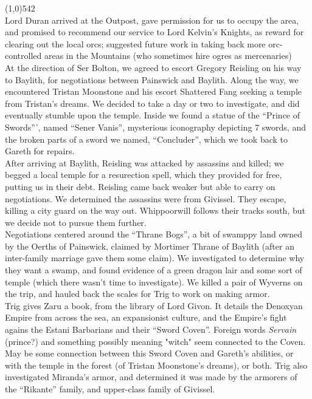 \documentclass[letterpaper]{article}
\newcommand{\fullline}{\noindent\line(1,0){542} \\}
\begin{document}
\vspace{-0.75em}
\fullline
\noindent Lord Duran arrived at the Outpost, gave permission for us to occupy the area, and promised to recommend our service to Lord Kelvin's Knights, as reward for clearing out the local orcs; suggested future work in taking back more orc-controlled areas in the Mountains (who sometimes hire ogres as mercenaries)\\

\noindent At the direction of Ser Bolton, we agreed to escort Gregory Reisling on his way to Baylith, for negotiations between Painswick and Baylith.  Along the way, we encountered Tristan Moonstone and his escort Shattered Fang seeking a temple from Tristan's dreams. We decided to take a day or two to investigate, and did eventually stumble upon the temple.  Inside we found a statue of the ``Prince of Swords''', named ``Sener Vanis'', mysterious iconography depicting 7 swords, and the broken parts of a sword we named, ``Concluder'', which we took back to Gareth for repairs.\\

\noindent After arriving at Baylith, Reisling was attacked by assassins and killed; we begged a local temple for a resurection spell, which they provided for free, putting us in their debt.  Reisling came back weaker but able to carry on negotiations.  We determined the assassins were from Givissel.  They escape, killing a city guard on the way out.  Whippoorwill follows their tracks south, but we decide not to pursue them further.\\

\noindent Negotiations centered around the ``Thrane Bogs'', a bit of swamppy land owned by the Oerths of Painswick, claimed by Mortimer Thrane of Baylith (after an inter-family marriage gave them some claim).  We investigated to determine why they want a swamp, and found evidence of a green dragon lair and some sort of temple (which there wasn't time to investigate).  We killed a pair of Wyverns on the trip, and hauled back the scales for Trig to work on making armor.\\

\noindent Trig gives Zaru a book, from the library of Lord Givon.  It details the Denoxyan Empire from across the sea, an expansionist culture, and the Empire's fight agains the Estani Barbarians and their ``Sword Coven''. Foreign words \emph{Servain} (prince?) and something possibly meaning "witch" seem connected to the Coven.  May be some connection between this Sword Coven and Gareth's abilities, or with the temple in the forest (of Tristan Moonstone's dreams), or both.  Trig also investigated Miranda's armor, and determined it was made by the armorers of the ``Rikante'' family, and upper-class family of Givissel.\\
\end{document}

